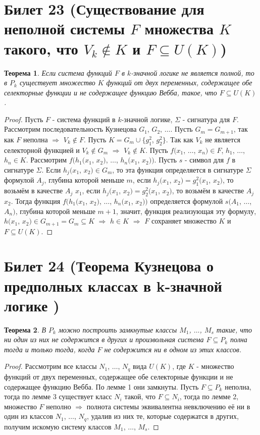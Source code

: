 \documentclass[a4paper, 12pt]{article}
\theoremstyle{definition}
\theoremstyle{plain}
\newtheorem*{theorem}{Теорема}
\theoremstyle{remark}
\begin{document}
  \section{Билет 23 (Существование для неполной системы $F$ множества $K$ такого, что $V_k\notin K$ и $F\subseteq U(K)$)}
  \begin{theorem}
    Если система функций $F$ в $k$-значной логике не является полной, то в $P_k$ существует множество $K$ функций от двух переменных, содержащее обе селекторные функции и не содержащее функцию Вебба, такое, что $F\subseteq  U(K)$.
  \end{theorem}
  \begin{proof}
    Пусть $F$ - система функций в $k$-значной логике, $\Sigma$ - сигнатура для $F$. Рассмотрим последовательность Кузнецова $G_1$, $G_2$, $\ldots$. Пусть $G_m=G_{m+1}$, так как $F$ неполна $\Longrightarrow$ $V_k\notin F$. Пусть $K=G_m\cup \{g_1^2$, $g_2^2\}$. Так как $V_k$ не является селекторной функцией и $V_k\notin G_m$ $\Longrightarrow$ $V_k\notin K$. Пусть $f(x_1$, $\ldots$, $x_n)\in F$, $h_1$, $\ldots$, $h_n\in K$. Рассмотрим $f(h_1(x_1$, $x_2)$, $\ldots$, $h_n(x_1$, $x_2))$. Пусть $s$ - символ для $f$ в сигнатуре $\Sigma$. Если $h_j(x_1$, $x_2)\in G_m$, то эта функция определяется в сигнатуре $\Sigma$ формулой $A_j$, глубина которой меньше $m$, если $h_j(x_1$, $x_2)=g_1^2(x_1$, $x_2)$, то возьмём в качестве $A_j$ $x_1$, если $h_j(x_1$, $x_2)=g_2^2(x_1$, $x_2)$, то возьмём в качестве $A_j$ $x_2$. Тогда функция $f(h_1(x_1$, $x_2)$, $\ldots$, $h_n(x_1$, $x_2))$ определяется формулой $s(A_1$, $\ldots$, $A_n)$, глубина которой меньше $m+1$, значит, функция реализующая эту формулу, $h(x_1$, $x_2)\in G_{m+1}=G_m\subseteq K$ $\Longrightarrow$ $h\in K$ $\Longrightarrow$ $F$ сохраняет множество $K$ и $F\subseteq U(K)$.
  \end{proof}
  \section{Билет 24 (Теорема Кузнецова о предполных классах в k-значной логике )}
  \begin{theorem}
    В $P_k$ можно построить замкнутые классы $M_1$, $\ldots$, $M_s$ такие, что ни один из них не содержится в других и произвольная система $F\subseteq P_k$ полна тогда и только тогда, когда $F$ не содержится ни в одном из этих классов.
  \end{theorem}
  \begin{proof}
    Рассмотрим все классы $N_1$, $\ldots$, $N_q$ вида $U(K)$, где $K$ - множество функций от двух переменных, содержащее обе селекторные функции и не содержащее функцию Вебба. По лемме 1 они замкнуты. Пусть $F\subseteq P_k$ неполна, тогда по лемме 3 существует класс $N_i$  такой, что $F\subseteq N_i$, тогда по лемме 2, множество $F$ неполно $\Longrightarrow$ полнота системы эквивалентна невключению её ни в один из классов $N_1$, $\ldots$, $N_q$, удалив из них те, которые содержатся в других, получим искомую систему классов $M_1$, $\ldots$, $M_s$.
  \end{proof}
\end{document}
